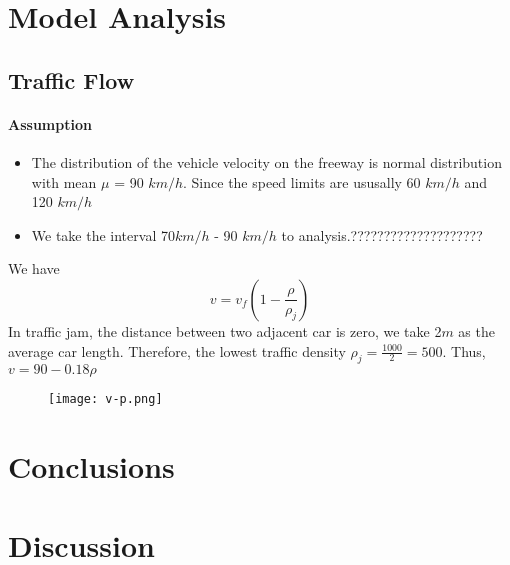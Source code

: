 
\section{Model Analysis}

\subsection{Traffic Flow}
\paragraph{Assumption}
\begin{itemize}
\item The distribution of the
vehicle velocity on the freeway
is normal distribution with mean
$\mu$ = 90 $km/h$. Since the speed 
limits are ususally 60 $km/h$ and 120 $km/h$
\item We take the interval 70$km/h$ - 90 $km/h$
to analysis.????????????????????
\end{itemize}

We have 
\begin{equation}
v = v_f(1 - \frac{\rho}{\rho_j})
\end{equation}
In traffic jam, the distance between two adjacent car is zero, we take 2$m$ as the average car length. Therefore, the lowest
traffic density 
$\rho_j = \frac{1000}{2} = 500$.
Thus, $v = 90 - 0.18 \rho$

\begin{figure}[h]
\small
\texttt{[image: v-p.png]}
\end{figure}



\section{Conclusions}




\section{Discussion}

